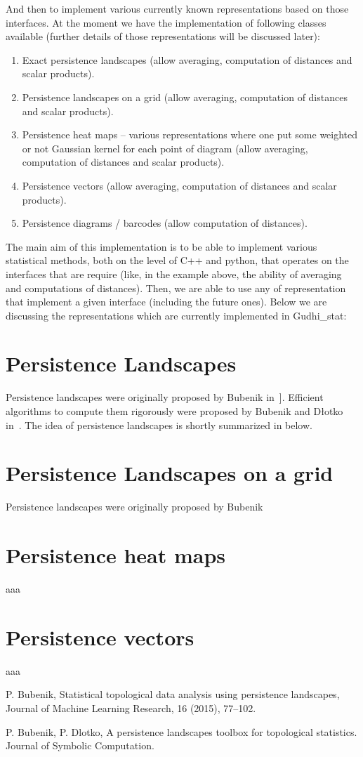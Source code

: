 \documentclass[11pt]{article}
\begin{document}
And then to implement various currently known representations based on those interfaces. At the moment we have the implementation of following classes available (further details of those representations will be discussed later):
\begin{enumerate}
\item Exact persistence landscapes (allow averaging, computation of distances and scalar products).
\item Persistence landscapes on a grid (allow averaging, computation of distances and scalar products).
\item Persistence heat maps – various representations where one put some weighted or not Gaussian kernel for each point of diagram (allow averaging, computation of distances and scalar products).
\item Persistence vectors (allow averaging, computation of distances and scalar products).
\item Persistence diagrams / barcodes (allow computation of distances).
\end{enumerate}


The main aim of this implementation is to be able to implement various statistical methods, both on the level of C++ and python, that operates on the interfaces that are require (like, in the example above, the ability of averaging and computations of distances). Then, we are able to use any of representation that implement a given interface (including the future ones). Below we are discussing the representations which are currently implemented in Gudhi\_stat:


\section{Persistence Landscapes}
Persistence landscapes were originally proposed by Bubenik in~\cite{landscapes1}]. Efficient algorithms to compute them rigorously were proposed by Bubenik and Dłotko in~\cite{landscapes2}. The idea of persistence landscapes is shortly summarized in below.

\section{Persistence Landscapes on a grid}
Persistence landscapes were originally proposed by Bubenik
\section{Persistence heat maps}
aaa
\section{Persistence vectors}
aaa

\begin{thebibliography}{99}
  P. Bubenik, Statistical topological data analysis using persistence landscapes, Journal of Machine Learning Research, 16 (2015), 77–102.

 P. Bubenik, P. Dlotko, A persistence landscapes toolbox for topological statistics. Journal of Symbolic Computation.

\end{thebibliography}
\end{document}
